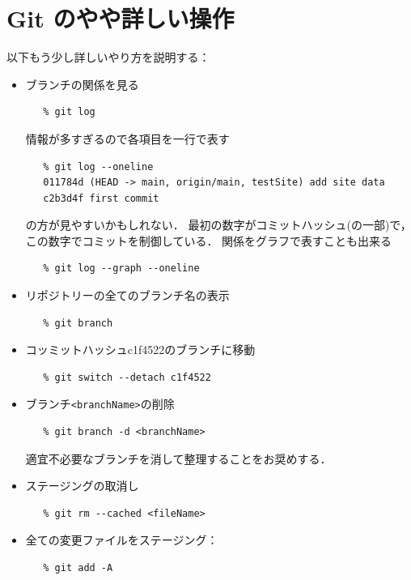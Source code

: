 \section{Git のやや詳しい操作}
以下もう少し詳しいやり方を説明する：
\begin{itemize}
   
   \item
      ブランチの関係を見る
\begin{verbatim}
   % git log
\end{verbatim}

      \noindent
      情報が多すぎるので各項目を一行で表す
\begin{verbatim}
   % git log --oneline
   011784d (HEAD -> main, origin/main, testSite) add site data
   c2b3d4f first commit
\end{verbatim}
      の方が見やすいかもしれない．
      最初の数字がコミットハッシュ(の一部)で，この数字でコミットを制御している．
      関係をグラフで表すことも出来る
\begin{verbatim}
   % git log --graph --oneline
\end{verbatim}

   \item
      リポジトリーの全てのブランチ名の表示
\begin{verbatim}
   % git branch
\end{verbatim}

   \item
      コッミットハッシュc1f4522のブランチに移動
\begin{verbatim}
   % git switch --detach c1f4522
\end{verbatim}

   \item
      ブランチ\verb/<branchName>/の削除
\begin{verbatim}
   % git branch -d <branchName>
\end{verbatim}
      適宜不必要なブランチを消して整理することをお奨めする．

   \item
      ステージングの取消し
\begin{verbatim}
   % git rm --cached <fileName>   
\end{verbatim}

   \item
       全ての変更ファイルをステージング：
\begin{verbatim}
   % git add -A
\end{verbatim}


\end{itemize}
